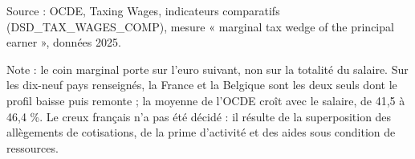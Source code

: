 Source : OCDE, Taxing Wages, indicateurs comparatifs (DSD\_TAX\_WAGES\_COMP), mesure « marginal tax wedge of the principal earner », données 2025.\par Note : le coin marginal porte sur l'euro suivant, non sur la totalité du salaire. Sur les dix-neuf pays renseignés, la France et la Belgique sont les deux seuls dont le profil baisse puis remonte ; la moyenne de l'OCDE croît avec le salaire, de 41,5 à 46,4 \%. Le creux français n'a pas été décidé : il résulte de la superposition des allègements de cotisations, de la prime d'activité et des aides sous condition de ressources.
